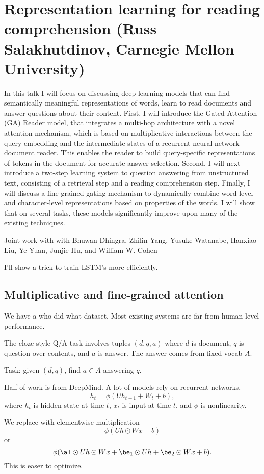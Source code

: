 \section{Representation learning for reading comprehension (Russ Salakhutdinov, Carnegie Mellon University)}

In this talk I will focus on discussing deep learning models that can find semantically meaningful representations of words, learn to read documents and answer questions about their content. First, I will introduce the Gated-Attention (GA) Reader model, that  integrates a multi-hop architecture with a novel attention mechanism, which is based on multiplicative interactions between the query embedding and the intermediate states of a recurrent neural network document reader. This enables the reader to build query-specific representations of tokens in the document for accurate answer selection. Second, I will next introduce a two-step learning system to question answering from unstructured text, consisting of a retrieval step and a reading comprehension step. Finally, I will discuss a fine-grained gating mechanism to dynamically combine word-level and character-level representations based on properties of the words. I will show that on several tasks, these models significantly improve upon many of the existing techniques.

Joint work with with Bhuwan Dhingra, Zhilin Yang, Yusuke Watanabe, Hanxiao Liu, Ye Yuan, Junjie Hu, and William W. Cohen

I'll show a trick to train LSTM's more efficiently.

\subsection{Multiplicative and fine-grained attention}

We have a who-did-what dataset. Most existing systems are far from human-level performance. 

The cloze-style Q/A task involves tuples $(d,q,a)$ where $d$ is document, $q$ is question over contents, and $a$ is answer. The answer comes from fixed vocab $A$. 

Task: given $(d,q)$, find $a\in A$ answering $q$.

Half of work is from DeepMind. A lot of models rely on recurrent networks, 
$$h_t=\phi(Uh_{t-1}+W_t+b),$$
where $h_t$ is hidden state at time $t$, $x_t$ is input at time $t$, and $\phi$ is nonlinearity.

We replace with elementwise multiplication
$$
\phi(Uh \odot Wx + b)
$$
or 
$$
\phi(\al\odot Uh \odot Wx + \be_1\odot Uh + \be_2\odot Wx+b).
$$
This is easer to optimize.

